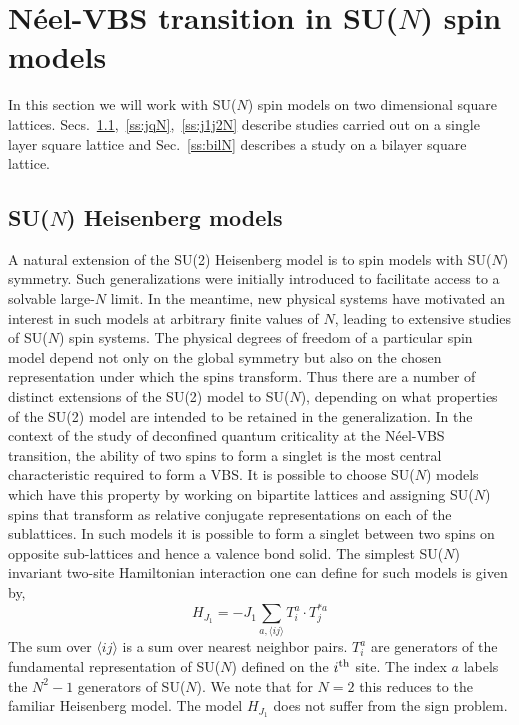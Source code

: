 \documentclass[aps,prb,groupedaddress,twocolumn]{revtex4}
\begin{document}
\section{N\'eel-VBS transition in SU($N$) spin models}

In this section we will work with SU($N$) spin models on two
dimensional  square
lattices. Secs.~\ref{ss:j1N},~\ref{ss:jqN},~\ref{ss:j1j2N} describe
studies carried out on a single layer square lattice and
Sec.~\ref{ss:bilN} describes a study on a bilayer square
lattice. 

\subsection{SU($N$) Heisenberg models}
\label{ss:j1N}

A natural extension of the SU(2) Heisenberg model is to spin models with
SU($N$) symmetry. Such generalizations were initially introduced to
facilitate access to
a solvable large-$N$ limit. In the meantime, new physical systems have
motivated an interest in such models at arbitrary finite values of
$N$, leading to extensive studies of SU($N$) spin systems. The physical degrees of freedom of a particular
spin model depend not only on the global symmetry but also on the
chosen representation under which the spins transform. Thus there are
a number of distinct extensions of the SU(2) model to SU($N$), depending on
what properties of the SU(2) model are intended to be retained in the
generalization. In the context of the study of deconfined quantum criticality at the
N\'eel-VBS transition, the ability of two spins to form a singlet is the most
central characteristic required to form a VBS. It
is possible to choose SU($N$) models which have this property by
working on bipartite lattices and
assigning SU($N$) spins that transform
as relative conjugate representations
 on each of the sublattices. In such models it is possible to form a singlet
between two spins on opposite sub-lattices and hence a valence bond
solid.  The simplest SU($N$) invariant two-site Hamiltonian interaction one can define for
such models is given by,
\begin{equation}
\label{ham:j1}
H_{J_1} = -J_1 \sum_{a,\langle ij\rangle} T^a_i\cdot T^{*a}_j
\end{equation}
The sum over $\langle ij \rangle$ is a sum over nearest neighbor
pairs. $T^a_i$ are generators of the fundamental representation of SU($N$) defined on the
$i^{\rm th}$ site. The index $a$ labels the $N^2-1$ generators of
SU($N$). We note that for $N=2$ this reduces to the familiar
Heisenberg model. The model $H_{J_1}$ does not suffer from the sign
problem.
\end{document}
